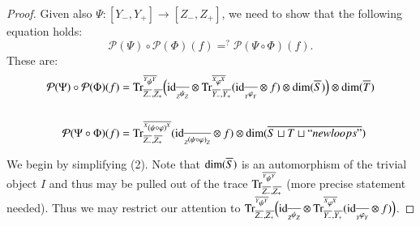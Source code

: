 \documentclass{amsart}
\def\tn{\textnormal}
\def\mc{\mathcal}
\def\dim{\tn{dim}}
\def\Trace{\tn{Tr}}
\def\taking{\colon}
\def\too{\longrightarrow}
\def\ol{\overline}
\def\id{\tn{id}}
\def\mcP{\mc{P}}
\newcommand{\inp}[1]{{#1_-}}
\newcommand{\outp}[1]{{#1_+}}
\newcommand{\feeddd}[3]{{\tensor*[^{#2}_{\color{white}{!}}]{{#1}}{^{#3}}}}%
\newcommand{\feedcc}[3]{{\tensor*[^{\color{white}{!}}_{#2}]{{#1}}{_{#3}}}}
\theoremstyle{remark}
\theoremstyle{definition}
\begin{document}
\begin{proof}
Given also $\Psi\taking[\inp{Y},\outp{Y}]\too[\inp{Z},\outp{Z}]$, we need to show that the following equation holds: 
$$\mcP(\Psi)\circ\mcP(\Phi)(f)=^?\mcP(\Psi\circ\Phi)(f).$$
These are:
\begin{align}
\label{eq:composition 1}
\mcP(\Psi)\circ\mcP(\Phi)(f)&=
\Trace^{\ol{\feeddd{\psi}{Y}{Y}}}_{\ol{Z_-},\ol{Z_+}}
\Big(
\id_{\ol{\feedcc{\psi}{Z}{Z}}}\otimes
\Trace^{\ol{\feeddd{\varphi}{X}{X}}}_{\ol{Y_-},\ol{Y_+}}(\id_{\ol{\feedcc{\varphi}{Y}{Y}}}\otimes f)\otimes\dim(\ol{S})
\Big)
\otimes\dim(\ol{T})
\\\nonumber\\
\label{eq:composition 2}
\mcP(\Psi\circ\Phi)(f)&=
\Trace^{\ol{\feeddd{(\psi\circ\varphi)}{X}{X}}}_{\ol{Z_-},\ol{Z_+}}(\id_{\ol{\feedcc{(\psi\circ\varphi)}{Z}{Z}}}\otimes f)\otimes\dim(\ol{S\sqcup T\sqcup ``newloops"})
\end{align}

We begin by simplifying (2).  Note that $\dim(\ol{S})$ is an automorphism of the trivial object $I$ and thus may be pulled out of the trace $\Trace^{\ol{\feeddd{\psi}{Y}{Y}}}_{\ol{Z_-},\ol{Z_+}}$ (more precise statement needed).  Thus we may restrict our attention to $\Trace^{\ol{\feeddd{\psi}{Y}{Y}}}_{\ol{Z_-},\ol{Z_+}}\Big(\id_{\ol{\feedcc{\psi}{Z}{Z}}}\otimes\Trace^{\ol{\feeddd{\varphi}{X}{X}}}_{\ol{Y_-},\ol{Y_+}}(\id_{\ol{\feedcc{\varphi}{Y}{Y}}}\otimes f)\Big)$.


\end{proof}
\end{document}
